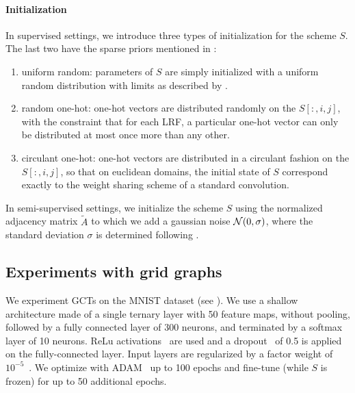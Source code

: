 \paragraph{Initialization}
In supervised settings, we introduce three types of initialization for the scheme $S$. The last two have the sparse priors mentioned in :
\begin{enumerate}
  \item uniform random: parameters of $S$ are simply initialized with a uniform random distribution with limits as described by \cite{glorot2010understanding}.
  \item random one-hot: one-hot vectors are distributed randomly on the $S[:,i,j]$, with the constraint that for each LRF, a particular one-hot vector can only be distributed at most once more than any other.
  \item circulant one-hot: one-hot vectors are distributed in a circulant fashion on the $S[:,i,j]$, so that on euclidean domains, the initial state of $S$ correspond exactly to the weight sharing scheme of a standard convolution.
\end{enumerate}

In semi-supervised settings, we initialize the scheme $S$ using the normalized adjacency matrix $\widetilde{A}$ to which we add a gaussian noise $\mathcal{N}(0,\sigma)$, where the standard deviation $\sigma$ is determined following \cite{glorot2010understanding}.

\subsection{Experiments with grid graphs}

We experiment GCTs on the MNIST dataset (see ). We use a shallow architecture made of a single ternary layer with 50 feature maps, without pooling, followed by a fully connected layer of 300 neurons, and terminated by a softmax layer of 10 neurons. ReLu activations~\citep{glorot2011deep} are used and a dropout~\citep{srivastava2014dropout} of 0.5 is applied on the fully-connected layer. Input layers are regularized by a factor weight of $10^{-5}$~\citep{ng2004feature}. We optimize with ADAM~\citep{kingma2014adam} up to 100 epochs and fine-tune (while $S$ is frozen) for up to 50 additional epochs.

